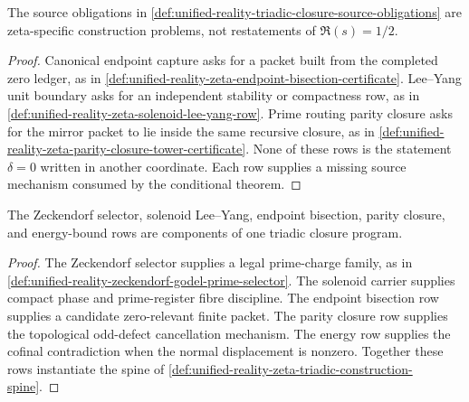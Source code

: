 \begin{corollary}
\label{cor:unified-reality-triadic-source-obligations-not-aliases}
The source obligations in
\autoref{def:unified-reality-triadic-closure-source-obligations} are
zeta-specific construction problems, not restatements of
$\Re(s)=1/2$.
\end{corollary}

\begin{proof}
Canonical endpoint capture asks for a packet built from the completed
zero ledger, as in
\autoref{def:unified-reality-zeta-endpoint-bisection-certificate}.
Lee--Yang unit boundary asks for an independent stability or compactness
row, as in
\autoref{def:unified-reality-zeta-solenoid-lee-yang-row}.  Prime routing
parity closure asks for the mirror packet to lie inside the same
recursive closure, as in
\autoref{def:unified-reality-zeta-parity-closure-tower-certificate}.
None of these rows is the statement $\delta=0$ written in another
coordinate.  Each row supplies a missing source mechanism consumed by
the conditional theorem.
\end{proof}

\begin{corollary}
\label{cor:unified-reality-selector-solenoid-endpoint-one-program}
The Zeckendorf selector, solenoid Lee--Yang, endpoint bisection, parity
closure, and energy-bound rows are components of one triadic closure
program.
\end{corollary}

\begin{proof}
The Zeckendorf selector supplies a legal prime-charge family, as in
\autoref{def:unified-reality-zeckendorf-godel-prime-selector}.  The
solenoid carrier supplies compact phase and prime-register fibre
discipline.  The endpoint bisection row supplies a candidate
zero-relevant finite packet.  The parity closure row supplies the
topological odd-defect cancellation mechanism.  The energy row supplies
the cofinal contradiction when the normal displacement is nonzero.
Together these rows instantiate the spine of
\autoref{def:unified-reality-zeta-triadic-construction-spine}.
\end{proof}

